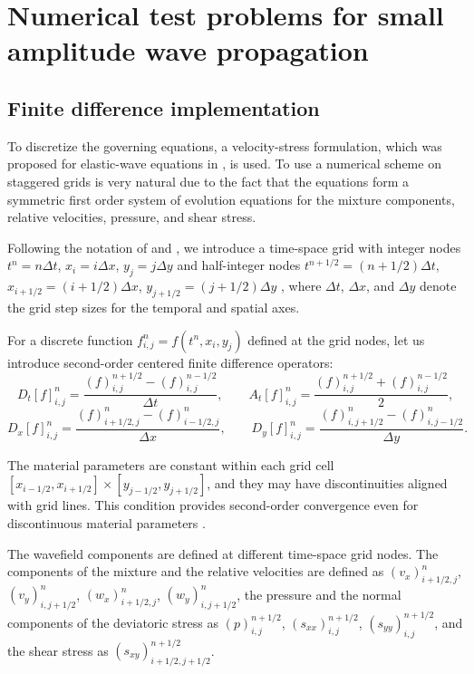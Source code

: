 \documentclass[3p,times,table]{article}
\begin{document}
\section{Numerical test problems for small amplitude wave 
propagation}\label{sec.numerics}

\subsection{Finite difference implementation}
To discretize the governing equations, a velocity-stress formulation, which was
proposed for elastic-wave equations in  \cite{Levander1988,Virieux1986}, is used. 
To use a numerical scheme on staggered grids is very natural due to 
the fact that the equations form a symmetric first order system of evolution 
equations for the  mixture components, relative velocities, pressure, and 
shear stress.

Following the notation of \cite{Virieux1986} and \cite{Graves1996}, we 
introduce a time-space grid with integer nodes $t^{n}=n\Delta t$, 
$x_{i}=i\Delta 
x$, $y_{j}=j\Delta y$  and half-integer nodes $t^{n+1/2}=(n+1/2)\Delta t$, 
$x_{i+1/2}=(i+1/2)\Delta x$, $y_{j+1/2}=(j+1/2)\Delta y$ , where  $\Delta t$, 
$\Delta x$, and $\Delta y$ denote the grid step sizes for the temporal and spatial 
axes.

 For a discrete function $f_{i,j}^{n}=f(t^{n},x_{i},y_{j})$ defined at the grid 
 nodes, let us introduce second-order  centered finite difference 
 operators:
\begin{equation}
    D_t[f]_{i, j}^{n} = \frac{(f)_{i, j}^{n+1/2} - (f)_{i, j}^{n-1/2}}{\Delta t}, \qquad A_t[f]_{i, j}^{n} = \frac{(f)_{i, j}^{n+1/2} + (f)_{i ,j}^{n-1/2}}{2},
    \label{Dt}
\end{equation}
\begin{equation}
    D_x[f]_{i, j}^n = \frac{(f)_{i+1/2, j}^{n} - (f)_{i-1/2, j}^{n}}{\Delta x}, \qquad D_y[f]_{i, j}^n = \frac{(f)_{i, j+1/2}^{n} - (f)_{i, j-1/2}^{n}}{\Delta y}.
    \label{Dx}
\end{equation}

The material parameters are constant within each grid cell 
$[x_{i-1/2}, x_{i+1/2}] \times[ y_{j-1/2}, y_{j+1/2}]$, and they may have 
discontinuities aligned with grid lines. This condition provides  
second-order convergence even for discontinuous material parameters 
\cite{Moszo2002}.

The wavefield components are defined at different time-space grid nodes. The 
components of the mixture and the relative velocities are defined as $(v_x)_{i+1/2, 
j}^{n}$, $(v_y)_{i, j+1/2}^{n}$, $(w_x)_{i+1/2, j}^{n}$, $(w_y)_{i, 
j+1/2}^{n}$, the pressure and the normal components of the deviatoric stress as 
$(p)_{i,j}^{n+1/2}$,  $(s_{xx})_{i,j}^{n+1/2}$, $(s_{yy})_{i,j}^{n+1/2}$, and 
the shear stress as $(s_{xy})_{i+1/2, j+1/2}^{n+1/2}$.
\end{document}
